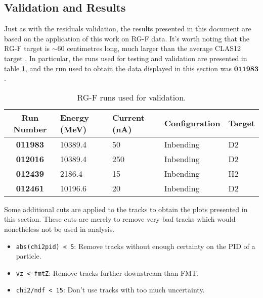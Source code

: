\subsection{Validation and Results}
\label{ssec::validation_and_results}
    Just as with the residuals validation, the results presented in this document are based on the application of this work on RG-F data.
    It's worth noting that the RG-F target is $\sim60$ centimetres long, much larger than the average CLAS12 target \cite{hattawy2019}.
    In particular, the runs used for testing and validation are presented in table \ref{tab::rgf_data}, and the run used to obtain the data displayed in this section was $\mathbf{011983}$.

    \begin{table}[h!]
        \centering
        \begin{tabular}{c|llll}
            \textbf{Run Number} & \textbf{Energy (MeV)} & \textbf{Current (nA)} & \textbf{Configuration} & \textbf{Target} \\
            \hline
            \textbf{011983}     & 10389.4 &  50 & Inbending & D2 \\
            \textbf{012016}     & 10389.4 & 250 & Inbending & D2 \\
            \textbf{012439}     &  2186.4 &  15 & Inbending & H2 \\
            \textbf{012461}     & 10196.6 &  20 & Inbending & D2
        \end{tabular}
        \caption{RG-F runs used for validation.}
        \label{tab::rgf_data}
    \end{table}

    Some additional cuts are applied to the tracks to obtain the plots presented in this section.
    These cuts are merely to remove very bad tracks which would nonetheless not be used in analysis.
    \begin{itemize}
        \item \texttt{abs(chi2pid) < 5}: Remove tracks without enough certainty on the PID of a particle.
        \item \texttt{vz < fmtZ}: Remove tracks further downstream than FMT.
        \item \texttt{chi2/ndf < 15}: Don't use tracks with too much uncertainty.
    \end{itemize}

